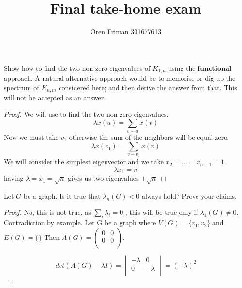 \documentclass[a4paper, 11pt, oneside]{article}
\newenvironment{problem}[1]
  {\renewcommand\theinnercustomprob{#1}\innercustomprob}
  {\endinnercustomprob}
\begin{document}
\title{Final take-home exam}
\author{Oren Friman 301677613}
\maketitle
				   
\begin{problem}{1}\label{problem1}
Show how to find the two non-zero eigenvalues of $K_{1,n}$ using the \textbf{functional}
approach. A natural alternative approach would be to memorise or dig up the spectrum of $K_{n,m}$
considered here; and then derive the answer from that. This will not be accepted as an answer.
\end{problem}

\begin{proof}
We will use \cite[Equation 1]{adjacency_matrix} to find  the two non-zero eigenvalues.
\begin{equation*}
\lambda x(u) = \sum_{v \sim u} x(v)
\end{equation*}
Now we must take $v_1$ otherwise the sum of the neighbors will be equal zero.
\begin{equation*}
\lambda x(v_1) = \sum_{v \sim v_1} x(v)
\end{equation*}
We will consider the simplest eigenvector  and we take $x_2 = \ldots = x_{n+1} = 1$.
\begin{equation*}
\lambda x_1 = n
\end{equation*}
having $\lambda = x_1 = \sqrt{n}$ gives us two eigenvalues $\pm \sqrt{n}$
\end{proof}		

\begin{problem}{2}\label{problem2}
Let $G$ be a graph. Is it true that $\lambda_n(G) < 0$ always hold? Prove your claims.
\end{problem}

\begin{proof}
No, this is not true, as $\sum_i \lambda_i = 0$ \cite{product_and_sum_of_eigenvalues}, this will be true only if $\lambda_1(G) \neq 0$.
Contradiction by example. Let G be a graph where $V(G) = \{v_1,v_2\}$ and $E(G) = \{\}$ Then
$A(G) = 
\begin{pmatrix}
0 & 0  \\
0& 0  \\
\end{pmatrix}$.

\begin{equation*}
det(A(G) - \lambda I) =
\begin{vmatrix}
-\lambda & 0            \\ 
0             & -\lambda \\
\end{vmatrix} = (-\lambda)^2
\end{equation*}
\end{proof}		
   
\end{document}
